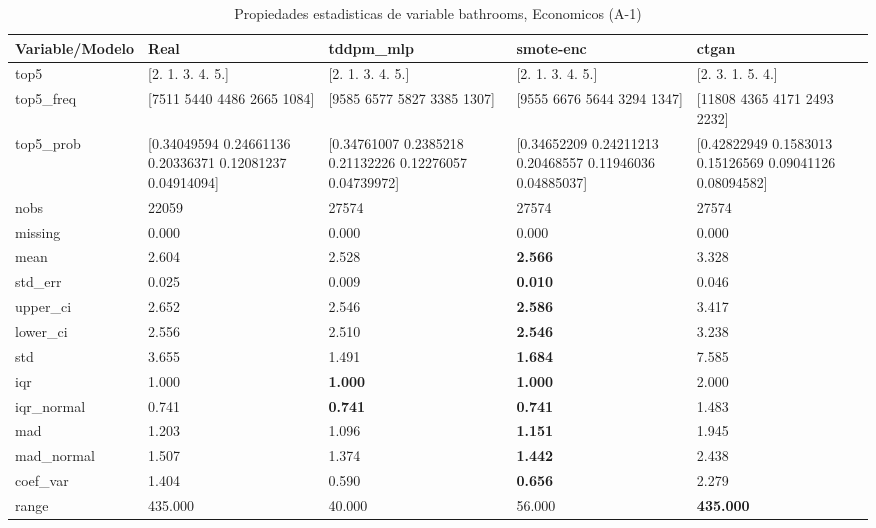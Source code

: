 \begin{table}[H]
\centering
\fontsize{8}{14}\selectfont
\caption{Propiedades  estadisticas de variable bathrooms, Economicos (A-1)}
\label{table-stats-economicos-a-1-bathrooms}
\begin{tabular}{|l|m{10em}|m{10em}|m{10em}|m{10em}|}
\hline
 \rowcolor[gray]{0.8}
Variable/Modelo & Real & tddpm\_mlp & smote-enc & ctgan \\
\hline top5 & [2. 1. 3. 4. 5.] & [2. 1. 3. 4. 5.] & [2. 1. 3. 4. 5.] & [2. 3. 1. 5. 4.] \\
\hline top5\_freq & [7511 5440 4486 2665 1084] & [9585 6577 5827 3385 1307] & [9555 6676 5644 3294 1347] & [11808  4365  4171  2493  2232] \\
\hline top5\_prob & [0.34049594 0.24661136 0.20336371 0.12081237 0.04914094] & [0.34761007 0.2385218  0.21132226 0.12276057 0.04739972] & [0.34652209 0.24211213 0.20468557 0.11946036 0.04885037] & [0.42822949 0.1583013  0.15126569 0.09041126 0.08094582] \\
\hline nobs & 22059 & 27574 & 27574 & 27574 \\
\hline missing & 0.000 & 0.000 & 0.000 & 0.000 \\
\hline mean & 2.604 & 2.528 & \bfseries 2.566 & \cellcolor[rgb]{0.9, 0.54, 0.52} 3.328 \\
\hline std\_err & 0.025 & 0.009 & \bfseries 0.010 & \cellcolor[rgb]{0.9, 0.54, 0.52} 0.046 \\
\hline upper\_ci & 2.652 & 2.546 & \bfseries 2.586 & \cellcolor[rgb]{0.9, 0.54, 0.52} 3.417 \\
\hline lower\_ci & 2.556 & 2.510 & \bfseries 2.546 & \cellcolor[rgb]{0.9, 0.54, 0.52} 3.238 \\
\hline std & 3.655 & 1.491 & \bfseries 1.684 & \cellcolor[rgb]{0.9, 0.54, 0.52} 7.585 \\
\hline iqr & 1.000 & \bfseries 1.000 & \bfseries 1.000 & \cellcolor[rgb]{0.9, 0.54, 0.52} 2.000 \\
\hline iqr\_normal & 0.741 & \bfseries 0.741 & \bfseries 0.741 & \cellcolor[rgb]{0.9, 0.54, 0.52} 1.483 \\
\hline mad & 1.203 & 1.096 & \bfseries 1.151 & \cellcolor[rgb]{0.9, 0.54, 0.52} 1.945 \\
\hline mad\_normal & 1.507 & 1.374 & \bfseries 1.442 & \cellcolor[rgb]{0.9, 0.54, 0.52} 2.438 \\
\hline coef\_var & 1.404 & 0.590 & \bfseries 0.656 & \cellcolor[rgb]{0.9, 0.54, 0.52} 2.279 \\
\hline range & 435.000 & \cellcolor[rgb]{0.9, 0.54, 0.52} 40.000 & 56.000 & \bfseries 435.000 \\

\end{tabular}
\end{table}
